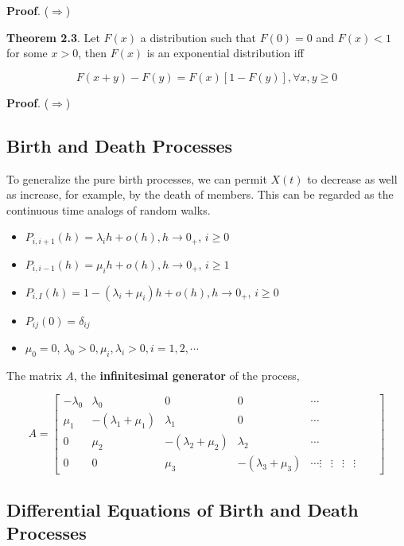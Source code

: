 \documentclass[12pt]{article}
\theoremstyle{nonumberbreak}
\begin{document}
\textbf{Proof}. ($\Rightarrow$) 




\begin{theorem}
\textbf{Theorem 2.3}. Let $F(x)$ a distribution such that $F(0) = 0$ and $F(x) < 1$ for some $x >0 $, then $F(x)$ is an exponential distribution iff

$$
F(x+y) - F(y) = F(x)[1-F(y)], \forall x,y \ge 0
$$
\end{theorem}

\textbf{Proof}. ($\Rightarrow$) 




\subsection{Birth and Death Processes}

To generalize the pure birth processes, we can permit $X(t)$ to decrease as well as increase, for example, by the death of members. This can be regarded as the continuous time analogs of random walks. 


\begin{itemize}
	\item $P_{i, i+1}(h) = \lambda_i h + o(h), h \to 0_+$, $i \ge 0$
	\item $P_{i, i-1}(h) = \mu_i h + o(h), h \to 0_+$, $i \ge 1$
	\item $P_{i,I} (h) = 1 -(\lambda_i + \mu_i) h + o(h), h \to 0_+$, $i \ge 0$
	\item $P_{ij} (0) = \delta_{ij}$
	\item $\mu_0 = 0$, $\lambda_0 > 0, \mu_i, \lambda_i > 0, i=1,2,\cdots$
\end{itemize}

The matrix $A$, the \textbf{infinitesimal generator} of the process,

$$
A = \begin{bmatrix}
-\lambda_0 & \lambda_0 & 0 & 0 & \cdots \\
\mu_1 & -(\lambda_1 + \mu_1)  & \lambda_1 & 0 & \cdots \\
0 & \mu_2 & -(\lambda_2 + \mu_2) & \lambda_2 & \cdots \\
0 & 0 & \mu_3 & -(\lambda_3 + \mu_3) & \cdots
\vdots & \vdots &  \vdots &  \vdots &   & 
\end{bmatrix}
$$



\subsection{Differential Equations of Birth and Death Processes}
\end{document}
